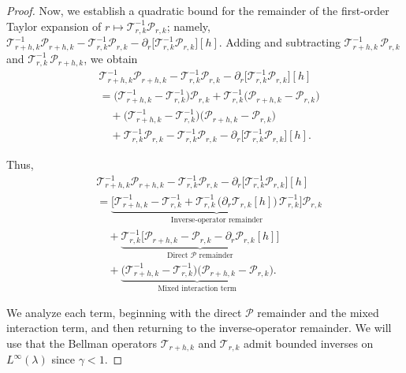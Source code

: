 \documentclass[11pt]{article}
\theoremstyle{plain}
\begin{document}
\begin{proof}
 
Now, we establish a quadratic bound for the remainder of the first-order Taylor expansion of $r \mapsto \mathcal{T}_{r,k}^{-1}\mathcal{P}_{r,k}$; namely,
$\mathcal{T}_{r+h,k}^{-1}\mathcal{P}_{r+h,k}
 - \mathcal{T}_{r,k}^{-1}\mathcal{P}_{r,k}
 - \partial_r\!\big[\mathcal{T}_{r,k}^{-1}\mathcal{P}_{r,k}\big][h]$. Adding and subtracting 
$\mathcal{T}_{r+h,k}^{-1}\,\mathcal{P}_{r,k}$ 
and 
$\mathcal{T}_{r,k}^{-1}\,\mathcal{P}_{r+h,k}$, 
we obtain
\begin{align*}
&\mathcal{T}_{r+ h,k}^{-1}\mathcal{P}_{r+ h,k}
 - \mathcal{T}_{r,k}^{-1}\mathcal{P}_{r,k}
 - \partial_r\!\big[\mathcal{T}_{r,k}^{-1}\mathcal{P}_{r,k}\big][h] \\
&= \Big(\mathcal{T}_{r+h,k}^{-1} - \mathcal{T}_{r,k}^{-1}\Big)\mathcal{P}_{r,k}
   + \mathcal{T}_{r,k}^{-1}\Big(\mathcal{P}_{r+h,k} - \mathcal{P}_{r,k}\Big) \\
&\quad + \Big(\mathcal{T}_{r+h,k}^{-1} - \mathcal{T}_{r,k}^{-1}\Big)
       \Big(\mathcal{P}_{r+h,k} - \mathcal{P}_{r,k}\Big) \\
&\quad + \mathcal{T}_{r,k}^{-1}\mathcal{P}_{r,k}
     - \mathcal{T}_{r,k}^{-1}\mathcal{P}_{r,k}
     - \partial_r\!\big[\mathcal{T}_{r,k}^{-1}\mathcal{P}_{r,k}\big][h].
\end{align*}


Thus,
\begin{align*}
&\mathcal{T}_{r+ h,k}^{-1}\mathcal{P}_{r+ h,k}
 - \mathcal{T}_{r,k}^{-1}\mathcal{P}_{r,k}
 - \partial_r\!\big[\mathcal{T}_{r,k}^{-1}\mathcal{P}_{r,k}\big][h] \\
&= \underbrace{\Big[\mathcal{T}_{r+h,k}^{-1} - \mathcal{T}_{r,k}^{-1}
         + \mathcal{T}_{r,k}^{-1}\,\big(\partial_r \mathcal{T}_{r,k}[h]\big)\,
           \mathcal{T}_{r,k}^{-1}\Big]\mathcal{P}_{r,k}}_{\text{Inverse-operator remainder}} \\
&\quad + \underbrace{\mathcal{T}_{r,k}^{-1}\Big[\mathcal{P}_{r+h,k} - \mathcal{P}_{r,k}
           - \partial_r \mathcal{P}_{r,k}[h]\Big]}_{\text{Direct $\mathcal{P}$ remainder}} \\
&\quad + \underbrace{\Big(\mathcal{T}_{r+h,k}^{-1} - \mathcal{T}_{r,k}^{-1}\Big)
       \Big(\mathcal{P}_{r+h,k} - \mathcal{P}_{r,k}\Big)}_{\text{Mixed interaction term}}.
\end{align*}


We analyze each term, beginning with the direct $\mathcal{P}$ remainder and the mixed interaction term, and then returning to the inverse-operator remainder. We will use that the Bellman operators $\mathcal{T}_{r+h,k}$ and $\mathcal{T}_{r,k}$ admit bounded inverses on $L^\infty(\lambda)$ since $\gamma < 1$.


\end{proof}
\end{document}
